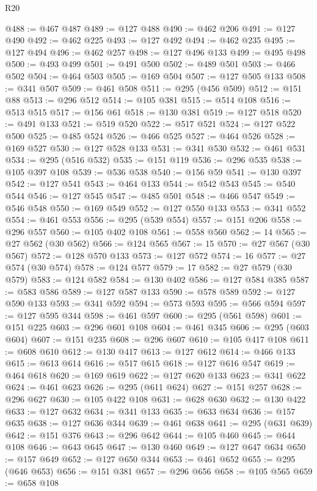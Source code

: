 \begin{lexlean}{R20}
\begin{coremodule}
{{{{{{{{{{{{{{{{{{{{{{{{{{{{{{{{{{{{{{{{{{{{{{{{{{{{{{{{{{{{{{{@488 := @467 @487
@489 := @127 @488
@490 := @462 @206
@491 := @127 @490
@492 := @462 @225
@493 := @127 @492
@494 := @462 @235
@495 := @127 @494
@496 := @462 @257
@498 := @127 @496 @133
@499 := @495 @498
@500 := @493 @499
@501 := @491 @500
@502 := @489 @501
@503 := @466 @502
@504 := @464 @503
@505 := @169 @504
@507 := @127 @505 @133
@508 := @341 @507
@509 := @461 @508
@511 := @295 (@456 @509)
@512 := @151 @88
@513 := @296 @512
@514 := @105 @381
@515 := @514 @108
@516 := @513 @515
@517 := @156 @61
@518 := @130 @381
@519 := @127 @518
@520 := @491 @133
@521 := @519 @520
@522 := @517 @521
@524 := @127 @522 @500
@525 := @485 @524
@526 := @466 @525
@527 := @464 @526
@528 := @169 @527
@530 := @127 @528 @133
@531 := @341 @530
@532 := @461 @531
@534 := @295 (@516 @532)
@535 := @151 @119
@536 := @296 @535
@538 := @105 @397 @108
@539 := @536 @538
@540 := @156 @59
@541 := @130 @397
@542 := @127 @541
@543 := @464 @133
@544 := @542 @543
@545 := @540 @544
@546 := @127 @545
@547 := @485 @501
@548 := @466 @547
@549 := @546 @548
@550 := @169 @549
@552 := @127 @550 @133
@553 := @341 @552
@554 := @461 @553
@556 := @295 (@539 @554)
@557 := @151 @206
@558 := @296 @557
@560 := @105 @402 @108
@561 := @558 @560
@562 := 14
@565 := @27 @562 (@30 @562)
@566 := @124 @565
@567 := 15
@570 := @27 @567 (@30 @567)
@572 := @128 @570 @133
@573 := @127 @572
@574 := 16
@577 := @27 @574 (@30 @574)
@578 := @124 @577
@579 := 17
@582 := @27 @579 (@30 @579)
@583 := @124 @582
@584 := @130 @402
@586 := @127 @584 @385
@587 := @583 @586
@589 := @127 @587 @133
@590 := @578 @589
@592 := @127 @590 @133
@593 := @341 @592
@594 := @573 @593
@595 := @566 @594
@597 := @127 @595 @344
@598 := @461 @597
@600 := @295 (@561 @598)
@601 := @151 @225
@603 := @296 @601 @108
@604 := @461 @345
@606 := @295 (@603 @604)
@607 := @151 @235
@608 := @296 @607
@610 := @105 @417 @108
@611 := @608 @610
@612 := @130 @417
@613 := @127 @612
@614 := @466 @133
@615 := @613 @614
@616 := @517 @615
@618 := @127 @616 @547
@619 := @464 @618
@620 := @169 @619
@622 := @127 @620 @133
@623 := @341 @622
@624 := @461 @623
@626 := @295 (@611 @624)
@627 := @151 @257
@628 := @296 @627
@630 := @105 @422 @108
@631 := @628 @630
@632 := @130 @422
@633 := @127 @632
@634 := @341 @133
@635 := @633 @634
@636 := @157 @635
@638 := @127 @636 @344
@639 := @461 @638
@641 := @295 (@631 @639)
@642 := @151 @376
@643 := @296 @642
@644 := @105 @460
@645 := @644 @108
@646 := @643 @645
@647 := @130 @460
@649 := @127 @647 @634
@650 := @157 @649
@652 := @127 @650 @344
@653 := @461 @652
@655 := @295 (@646 @653)
@656 := @151 @381
@657 := @296 @656
@658 := @105 @565
@659 := @658 @108
}}}}}}}}}}}}}}}}}}}}}}}}}}}}}}}}}}}}}}}}}}}}}}}}}}}}}}}}}}}}}}}
\end{coremodule}
\end{lexlean}
